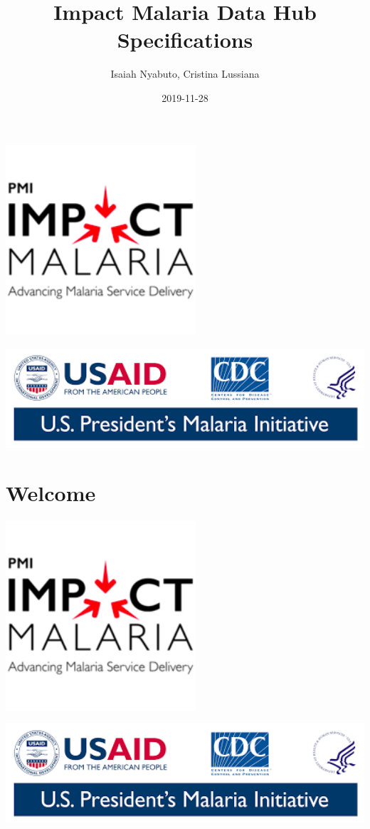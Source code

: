 \documentclass[]{book}
\title{Impact Malaria Data Hub Specifications}
\author{Isaiah Nyabuto, Cristina Lussiana}
\date{2019-11-28}
\begin{document}
\maketitle

{
\setcounter{tocdepth}{1}
\tableofcontents
}
\includegraphics[width=2.78in]{./images/logo1}

\includegraphics[width=5.93in]{./images/logo2}

\hypertarget{welcome}{%
\chapter*{Welcome}\label{welcome}}

\includegraphics[width=2.78in]{./images/logo1}

\includegraphics[width=5.93in]{./images/logo2}
\end{document}
